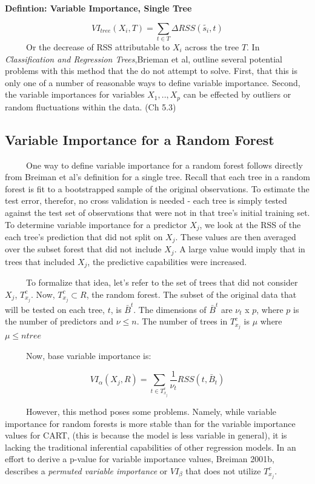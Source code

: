 \documentclass[12pt,twoside]{reedthesis}
\begin{document}
  \textbf{Defintion: Variable Importance, Single Tree}
  
  \[VI_{tree}(X_i, T) = \sum_{t \in T} \Delta RSS(\tilde{s_i}, t)\]
  ~~~~~Or the decrease of RSS attributable to \(X_i\) across the tree
  \(T\). In \emph{Classification and Regression Trees},Brieman et al,
  outline several potential problems with this method that the do not
  attempt to solve. First, that this is only one of a number of reasonable
  ways to define variable importance. Second, the variable importances for
  variables \(X_1,..,X_p\) can be effected by outliers or random
  fluctuations within the data. (Ch 5.3)
  
  \subsection{Variable Importance for a Random
  Forest}\label{variable-importance-for-a-random-forest}
  
  ~~~~~One way to define variable importance for a random forest follows
  directly from Breiman et al's definition for a single tree. Recall that
  each tree in a random forest is fit to a bootstrapped sample of the
  original observations. To estimate the test error, therefor, no cross
  validation is needed - each tree is simply tested against the test set
  of observations that were not in that tree's initial training set. To
  determine variable importance for a predictor \(X_j\), we look at the
  RSS of the each tree's prediction that did not split on \(X_j\). These
  values are then averaged over the subset forest that did not include
  \(X_j\). A large value would imply that in trees that included \(X_j\),
  the predictive capabilities were increased.
  
  ~~~~~To formalize that idea, let's refer to the set of trees that did
  not consider \(X_j\), \(T_{x_j}^c\). Now, \(T_{x_j}^c \subset R\), the
  random forest. The subset of the original data that will be tested on
  each tree, \(t\), is \(\bar{B}^t\). The dimensions of \(\bar{B}^t\) are
  \(\nu_t\) x \(p\), where \(p\) is the number of predictors and
  \(\nu \leq n\). The number of trees in \(T_{x_j}^c\) is \(\mu\) where
  \(\mu \leq ntree\)
  
  ~~~~~Now, base variable importance is:
  
  \[VI_{\alpha}(X_j, R) =  \sum_{t \in T_{x_j}^c} \frac 1 {\nu_t} RSS(t,\bar{B}_t)\]
  
  ~~~~~However, this method poses some problems. Namely, while variable
  importance for random forests is more stable than for the variable
  importance values for CART, (this is because the model is less variable
  in general), it is lacking the traditional inferential capabilities of
  other regression models. In an effort to derive a p-value for variable
  importance values, Breiman 2001b, describes a \emph{permuted variable
  importance} or \(VI_{\beta}\) that does not utilize \(T_{x_j}^c\).
  
\end{document}
